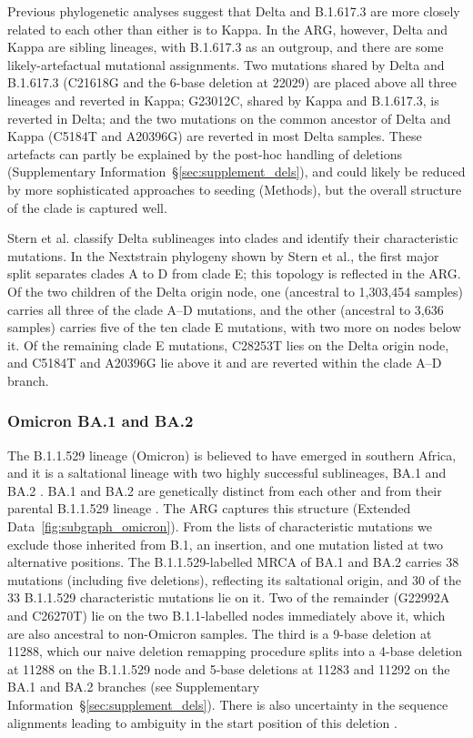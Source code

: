 \documentclass[12pt]{article}
\newcommand{\supref}[1]{Supplementary Information~\S\ref{#1}}
\newcommand{\edref}[1]{Extended Data~\ref{#1}}
\begin{document}
Previous phylogenetic analyses suggest that
Delta and B.1.617.3 are more closely related to each other
than either is to Kappa\cite{Cherian2021,Farinholt2021}.
In the ARG, however, Delta and Kappa are sibling lineages,
with B.1.617.3 as an outgroup, and there are some likely-artefactual
mutational assignments. Two mutations shared by Delta and B.1.617.3
(C21618G and the 6-base deletion at 22029)
are placed above all three lineages and reverted in Kappa;
G23012C, shared by Kappa and B.1.617.3, is reverted in Delta;
and the two mutations on the common ancestor of Delta and Kappa
(C5184T and A20396G) are reverted in most Delta samples.
These artefacts can partly be explained by the post-hoc handling of
deletions (\supref{sec:supplement_dels}),
and could likely be reduced by more sophisticated approaches to seeding (Methods),
but the overall structure of the clade is captured well.

Stern et al.\cite{Stern2021} classify Delta sublineages into clades
and identify their characteristic mutations.
In the Nextstrain phylogeny shown by Stern et al.,
the first major split separates clades A to D from clade E;
this topology is reflected in the ARG.
Of the two children of the Delta origin node,
one (ancestral to 1,303,454 samples) carries
all three of the clade A--D mutations, and
the other (ancestral to 3,636 samples) carries
five of the ten clade E mutations,
with two more on nodes below it.
Of the remaining clade E mutations,
C28253T lies on the Delta origin node,
and C5184T and A20396G lie above it
and are reverted within the clade A--D branch.

\subsubsection{Omicron BA.1 and BA.2}
\label{sec:dd_omicron}

The B.1.1.529 lineage (Omicron)
is believed to have emerged in southern Africa, and
it is a saltational lineage with two highly successful sublineages,
BA.1 and BA.2 \cite{Dor2025}.
BA.1 and BA.2 are genetically distinct from each other and
from their parental B.1.1.529 lineage \cite{RambautOmicron2021}.
The ARG captures this structure (\edref{fig:subgraph_omicron}).
From the lists of characteristic mutations \cite{RambautOmicron2021}
we exclude those inherited from B.1, an insertion,
and one mutation listed at two alternative positions.
The B.1.1.529-labelled MRCA of BA.1 and BA.2
carries 38 mutations (including five deletions),
reflecting its saltational origin, and
30 of the 33 B.1.1.529 characteristic mutations \cite{RambautOmicron2021} lie on it.
Two of the remainder (G22992A and C26270T) lie on
the two B.1.1-labelled nodes immediately above it,
which are also ancestral to non-Omicron samples.
The third is a 9-base deletion at 11288,
which our naive deletion remapping procedure
splits into a 4-base deletion at 11288 on the B.1.1.529 node
and 5-base deletions at 11283 and 11292
on the BA.1 and BA.2 branches
(see \supref{sec:supplement_dels}).
There is also uncertainty in the sequence alignments
leading to ambiguity in the start position of this deletion
\cite{RambautOmicron2021}.
\end{document}
